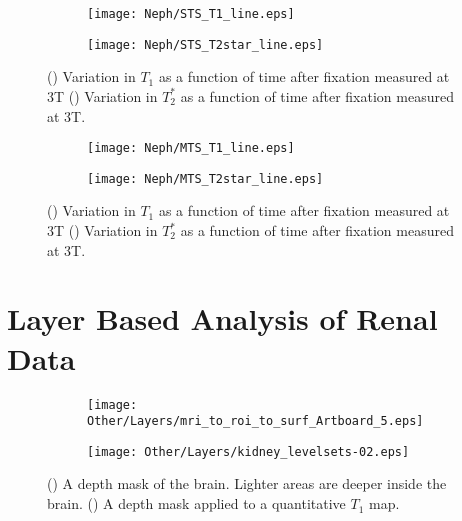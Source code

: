 \begin{figure}[H]
	\centering
	\begin{subfigure}[c]{0.47\textwidth}
		\centering
		\texttt{[image: Neph/STS\_T1\_line.eps]}
		\caption{}
		\label{fig:ex_fixation_t1_3t_sts}
	\end{subfigure}
	\hfill
	\begin{subfigure}[c]{0.47\textwidth}
		\centering
		\texttt{[image: Neph/STS\_T2star\_line.eps]}
		\caption{}
		\label{fig:ex_fixation_t2star_3t_sts}
	\end{subfigure}
	\caption{() Variation in $T_1$ as a function of time after fixation measured at 3T () Variation in $T_2^*$ as a function of time after fixation measured at 3T.}
	\label{fig:ex_fixation_sts}
\end{figure}

\begin{figure}[H]
	\centering
	\begin{subfigure}[c]{0.47\textwidth}
		\centering
		\texttt{[image: Neph/MTS\_T1\_line.eps]}
		\caption{}
		\label{fig:ex_fixation_t1_3t_mts}
	\end{subfigure}
	\hfill
	\begin{subfigure}[c]{0.47\textwidth}
		\centering
		\texttt{[image: Neph/MTS\_T2star\_line.eps]}
		\caption{}
		\label{fig:ex_fixation_t2star_3t_mts}
	\end{subfigure}
	\caption{() Variation in $T_1$ as a function of time after fixation measured at 3T () Variation in $T_2^*$ as a function of time after fixation measured at 3T.}
	\label{fig:ex_fixation_mts}
\end{figure}
\section{Layer Based Analysis of Renal Data}
\label{sec:ex_layers}
\begin{figure}[H]
	\centering
	\begin{subfigure}[c]{0.47\textwidth}
		\centering
		\texttt{[image: Other/Layers/mri\_to\_roi\_to\_surf\_Artboard\_5.eps]}
		\caption{}
		\label{fig:ex_layers_brain}
	\end{subfigure}
	\hfill
	\begin{subfigure}[c]{0.47\textwidth}
		\centering
		\texttt{[image: Other/Layers/kidney\_levelsets-02.eps]}
		\caption{}
		\label{fig:ex_layers_kidney}
	\end{subfigure}
	\caption{() A depth mask of the brain. Lighter areas are deeper inside the brain. () A depth mask applied to a quantitative $T_1$ map.}
	\label{fig:ex_layers_example}
\end{figure}

